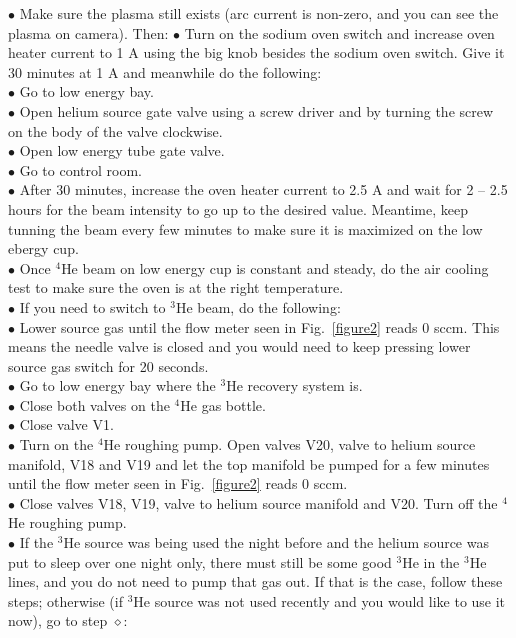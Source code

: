 \documentclass{article}
\begin{document}
$\bullet$ Make sure the plasma still exists (arc current is non-zero, and you can see the plasma on camera). Then:
$\bullet$ Turn on the sodium oven switch and increase oven heater current to 1 A using the big knob besides the sodium oven switch. Give it 30 minutes at 1 A and meanwhile do the following:\\
$\bullet$ Go to low energy bay.\\
$\bullet$ Open helium source gate valve using a screw driver and by turning the screw on the body of the valve clockwise.\\
$\bullet$ Open low energy tube gate valve.\\
$\bullet$ Go to control room.\\
$\bullet$ After 30 minutes, increase the oven heater current to 2.5 A and wait for 2 -- 2.5 hours for the beam intensity to go up to the desired value. Meantime, keep tunning the beam every few minutes to make sure it is maximized on the low ebergy cup.\\
$\bullet$ Once $^{4}$He beam on low energy cup is constant and steady, do the air cooling test to make sure the oven is at the right temperature.\\
$\bullet$ If you need to switch to $^{3}$He beam, do the following:\\
$\bullet$ Lower source gas until the flow meter seen in Fig.~\ref{figure2} reads 0 sccm. This means the needle valve is closed and you would need to keep pressing lower source gas switch for 20 seconds.\\
$\bullet$ Go to low energy bay where the $^{3}$He recovery system is.\\
$\bullet$ Close both valves on the $^{4}$He gas bottle.\\
$\bullet$ Close valve V1.\\
$\bullet$ Turn on the $^{4}$He roughing pump. Open valves V20, valve to helium source manifold, V18 and V19 and let the top manifold be pumped for a few minutes until the flow meter seen in Fig.~\ref{figure2} reads 0 sccm.\\
$\bullet$ Close valves V18, V19, valve to helium source manifold and V20. Turn off the $^{4}$He roughing pump.\\
$\bullet$ If the $^{3}$He source was being used the night before and the helium source was put to sleep over one night only, there must still be some good $^{3}$He in the $^{3}$He lines, and you do not need to pump that gas out. If that is the case, follow these steps; otherwise (if $^{3}$He source was not used recently and you would like to use it now), go to step $\diamond$:
\end{document}
